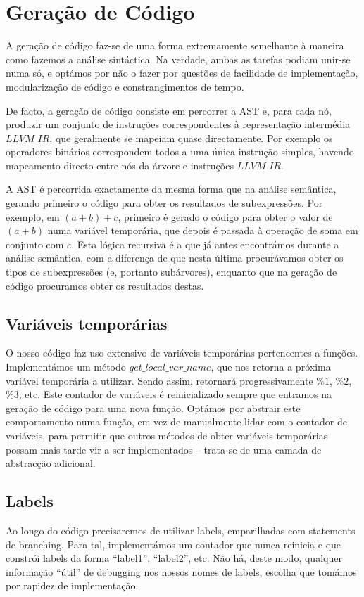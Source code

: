 \documentclass[11pt,a4paper]{article}
\begin{document}
	\pagebreak
	
\section{Geração de Código}

A geração de código faz-se de uma forma extremamente semelhante à maneira como fazemos a análise sintáctica. Na verdade, ambas as tarefas podiam unir-se numa só, e optámos por não o fazer por questões de facilidade de implementação, modularização de código e constrangimentos de tempo.

De facto, a geração de código consiste em percorrer a AST e, para cada nó, produzir um conjunto de instruções correspondentes à representação intermédia $LLVM$ $IR$, que geralmente se mapeiam quase directamente. Por exemplo os operadores binários correspondem todos a uma única instrução simples, havendo mapeamento directo entre nós da árvore e instruções $LLVM$ $IR$.

A AST é percorrida exactamente da mesma forma que na análise semântica, gerando primeiro o código para obter os resultados de subexpressões. Por exemplo, em $(a+b)+c$, primeiro é gerado o código para obter o valor de $(a+b)$ numa variável temporária, que depois é passada à operação de soma em conjunto com $c$. Esta lógica recursiva é a que já antes encontrámos durante a análise semântica, com a diferença de que nesta última procurávamos obter os tipos de subexpressões (e, portanto subárvores), enquanto que na geração de código procuramos obter os resultados destas.

\subsection{Variáveis temporárias}

O nosso código faz uso extensivo de variáveis temporárias pertencentes a funções. Implementámos um método $get\_local\_var\_name$, que nos retorna a próxima variável temporária a utilizar. Sendo assim, retornará progressivamente $\%1$, $\%2$, $\%3$, etc. Este contador de variáveis é reinicializado sempre que entramos na geração de código para uma nova função. Optámos por abstrair este comportamento numa função, em vez de manualmente lidar com o contador de variáveis, para permitir que outros métodos de obter variáveis temporárias possam mais tarde vir a ser implementados -- trata-se de uma camada de abstracção adicional.

\subsection{Labels}
Ao longo do código precisaremos de utilizar labels, emparilhadas com statements de branching. Para tal, implementámos um contador que nunca reinicia e que constrói labels da forma ``label1'', ``label2'', etc. Não há, deste modo, qualquer informação ``útil'' de debugging nos nossos nomes de labels, escolha que tomámos por rapidez de implementação.
\end{document}
